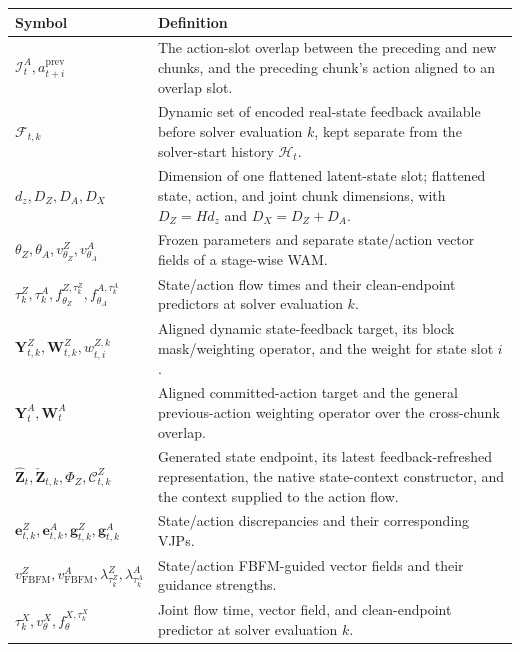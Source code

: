 \begin{table}[t]
    \centering
    \scriptsize
    \renewcommand{\arraystretch}{1.12}
    \begin{tabular}{p{} p{}}
        \hline
        \textbf{Symbol} & \textbf{Definition}\\
        \hline
        $\mathcal I_t^A,a_{t+i}^{\mathrm{prev}}$
        & The action-slot overlap between the preceding and new chunks, and the preceding chunk's action aligned to an overlap slot.\\
        $\mathcal F_{t,k}$
        & Dynamic set of encoded real-state feedback available before solver evaluation $k$, kept separate from the solver-start history $\mathcal H_t$.\\
        $d_z,D_Z,D_A,D_X$
        & Dimension of one flattened latent-state slot; flattened state, action, and joint chunk dimensions, with $D_Z=Hd_z$ and $D_X=D_Z+D_A$.\\
        $\theta_Z,\theta_A,v_{\theta_Z}^Z,v_{\theta_A}^A$
        & Frozen parameters and separate state/action vector fields of a stage-wise WAM.\\
        $\tau_k^Z,\tau_k^A,f_{\theta_Z}^{Z,\tau_k^Z},f_{\theta_A}^{A,\tau_k^A}$
        & State/action flow times and their clean-endpoint predictors at solver evaluation $k$.\\
        $\mathbf Y_{t,k}^Z,\mathbf W_{t,k}^Z,w_{t,i}^{Z,k}$
        & Aligned dynamic state-feedback target, its block mask/weighting operator, and the weight for state slot $i$.\\
        $\mathbf Y_t^A,\mathbf W_t^A$
        & Aligned committed-action target and the general previous-action weighting operator over the cross-chunk overlap.\\
        $\hat{\mathbf Z}_t,\check{\mathbf Z}_{t,k},\Phi_Z,\mathcal C_{t,k}^Z$
        & Generated state endpoint, its latest feedback-refreshed representation, the native state-context constructor, and the context supplied to the action flow.\\
        $\mathbf e_{t,k}^Z,\mathbf e_{t,k}^A,\mathbf g_{t,k}^Z,\mathbf g_{t,k}^A$
        & State/action discrepancies and their corresponding VJPs.\\
        $v_{\mathrm{FBFM}}^Z,v_{\mathrm{FBFM}}^A,\lambda_{\tau_k^Z}^Z,\lambda_{\tau_k^A}^A$
        & State/action FBFM-guided vector fields and their guidance strengths.\\
        $\tau_k^X,v_\theta^X,f_\theta^{X,\tau_k^X}$
        & Joint flow time, vector field, and clean-endpoint predictor at solver evaluation $k$.\\

\end{tabular}
\end{table}
